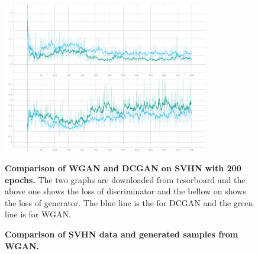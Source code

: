\documentclass{article}
\newcommand{\mycaption}[2]{\caption[#1]{\textbf{#1.} #2}}
\begin{document}
\begin{figure}[!htb]
  \centering
  \includegraphics[width=0.8\textwidth]{imgs/svhn-train-discriminator-loss.png}
  \includegraphics[width=0.8\textwidth]{imgs/svhn-train-generator-loss.png}
  \mycaption{Comparison of WGAN and DCGAN on SVHN with 200 epochs}{The two graphs are downloaded from tesorboard and the above one shows the loss of discriminator and the bellow on shows the loss of generator. The blue line is the for DCGAN and the green line is for WGAN.}  
  \label{fig_GANs_SVHN}
\end{figure}

\begin{figure}[!htb]
  \centering
  \mycaption{Comparison of SVHN data and generated samples from WGAN}{}
\end{figure}
\end{document}
